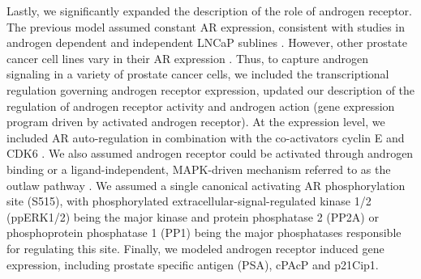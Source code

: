 \documentclass[12pt]{article}
\begin{document}
Lastly, we significantly expanded the description of the role of androgen receptor. 
The previous model assumed constant AR expression, consistent with studies in androgen dependent and independent LNCaP sublines \cite{Lee2003}.
However, other prostate cancer cell lines vary in their AR expression \cite{Sobel2005}. 
Thus, to capture androgen signaling in a variety of prostate cancer cells, we included the transcriptional regulation governing androgen receptor expression, updated our description of the regulation of androgen receptor activity and androgen action (gene expression program driven by activated androgen receptor). 
At the expression level, we included AR auto-regulation in combination with the co-activators cyclin E and CDK6 \cite{Yamamoto2000,Lim2005}. 
We also assumed androgen receptor could be activated through androgen binding or a ligand-independent, MAPK-driven mechanism referred to as the outlaw pathway \cite{Feldman2001,Yeh1999}. 
We assumed a single canonical activating AR phosphorylation site (S515), with phosphorylated extracellular-signal-regulated kinase 1/2 (ppERK1/2) being the major kinase and protein phosphatase 2 (PP2A) or phosphoprotein phosphatase 1 (PP1) being the major phosphatases responsible for regulating this site. 
Finally, we modeled androgen receptor induced gene expression, including prostate specific antigen (PSA), cPAcP and p21Cip1.

\end{document}
